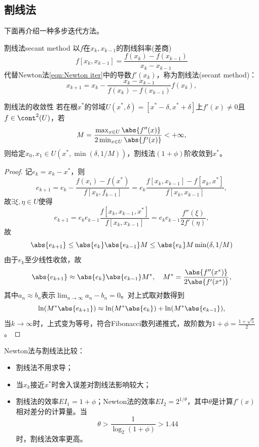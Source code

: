 \subsection{割线法}

下面再介绍一种多步迭代方法。

\begin{theorem}
    {割线法}{secant method}
    以$f$在$x_k,x_{k-1}$的割线斜率(差商)
    \[
        f[x_k,x_{k-1}]=\frac{f(x_k)-f(x_{k-1})}{x_k-x_{k-1}}
    \]
    代替Newton法\eqref{eqn:Newton iter}中的导数$f'(x_k)$，称为割线法(secant method)：
    \begin{equation}
        \label{eqn:secant line}
        x_{k+1}=x_k-\frac{x_k-x_{k-1}}{f(x_k)-f(x_{k-1})}f(x_k),
    \end{equation}
\end{theorem}

\begin{theorem}
    {割线法的收敛性}{}
    若在根$x^*$的邻域$U(x^*,\delta)=[x^*-\delta,x^*+\delta]$上$f'(x)\neq 0$且$f\in\cont^2(U)$，若
    \[
        M=\frac{\max_{x\in U}\abs{f''(x)}}{2\min_{x\in U}\abs{f'(x)}}<+\infty,
    \]
    则给定$x_0,x_1\in U(x^*,\min(\delta,1/M))$，割线法$(1+\phi)$阶收敛到$x^*$。
\end{theorem}

\begin{proof}
    记$e_k=x_k-x^*$，则 
    \[
        e_{k+1}=e_k-\frac{f(x_i)-f(x^*)}{f[x_k,f_{k-1}]}=e_k\frac{f[x_k,x_{k-1}]-f[x_k,x^*]}{f[x_k,x_{k-1}]},
    \]
    故$\exists\xi,\eta\in U$使得
    \[
        e_{k+1}=e_ke_{k-1}\frac{f[x_k,x_{k-1},x^*]}{f[x_k,x_{k-1}]}=e_ke_{k-1}\frac{f''(\xi)}{2f'(\eta)},
    \]
    故
    \[
        \abs{e_{k+1}}\leq\abs{e_k}\abs{e_{k-1}}M\leq\abs{e_k}M\min(\delta,1/M)
    \]
    由于$e_k$至少线性收敛，故 %
    \[
        \abs{e_{k+1}}\approx\abs{e_k}\abs{e_{k-1}}M^*,\quad M^*=\frac{\abs{f''(x^*)}}{2\abs{f'(x^*)}},
    \]
    其中$a_n\approx b_n$表示$\lim_{n\to\infty}a_n-b_n=0$。对上式取对数得到
    \[
        \ln(M^*\abs{e_{k+1}})\approx\ln(M^*\abs{e_k})+\ln(M^*\abs{e_{k-1}}),
    \]
    当$k\to\infty$时，上式变为等号，符合Fibonacci数列递推式，故阶数为$1+\phi=\frac{1+\sqrt5}2$。
\end{proof}

\begin{remark}
    Newton法与割线法比较：
    \begin{itemize}
        \item 割线法不用求导；
        \item 当$x_k$接近$x^*$时舍入误差对割线法影响较大；
        \item 割线法的效率$EI_1=1+\phi$；Newton法的效率$EI_2=2^{1/\theta}$，其中$\theta$是计算$f'(x)$相对差分的计算量。当
        \[
            \theta>\frac1{\log_2(1+\phi)}>1.44
        \]
        时，割线法效率更高。
    \end{itemize}
\end{remark}

